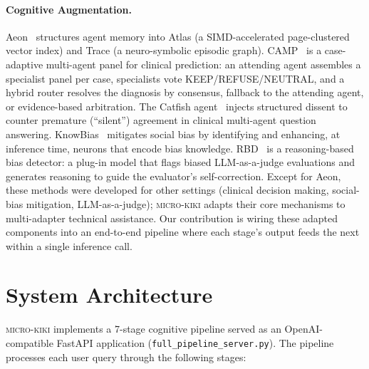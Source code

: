 \documentclass[11pt,a4paper]{article}
\begin{document}
\paragraph{Cognitive Augmentation.}
Aeon~\citep{aeon2025} structures agent memory into Atlas (a SIMD-accelerated page-clustered vector index) and Trace (a neuro-symbolic episodic graph). CAMP~\citep{camp2026} is a case-adaptive multi-agent panel for clinical prediction: an attending agent assembles a specialist panel per case, specialists vote KEEP/REFUSE/NEUTRAL, and a hybrid router resolves the diagnosis by consensus, fallback to the attending agent, or evidence-based arbitration. The Catfish agent~\citep{catfish2025} injects structured dissent to counter premature (``silent'') agreement in clinical multi-agent question answering. KnowBias~\citep{knowbias2025} mitigates social bias by identifying and enhancing, at inference time, neurons that encode bias knowledge. RBD~\citep{rbd2025} is a reasoning-based bias detector: a plug-in model that flags biased LLM-as-a-judge evaluations and generates reasoning to guide the evaluator's self-correction. Except for Aeon, these methods were developed for other settings (clinical decision making, social-bias mitigation, LLM-as-a-judge); \textsc{micro-kiki} adapts their core mechanisms to multi-adapter technical assistance. Our contribution is wiring these adapted components into an end-to-end pipeline where each stage's output feeds the next within a single inference call.

\section{System Architecture}
\label{sec:architecture}

\textsc{micro-kiki} implements a 7-stage cognitive pipeline served as an OpenAI-compatible FastAPI application (\texttt{full\_pipeline\_server.py}). The pipeline processes each user query through the following stages:
\end{document}
